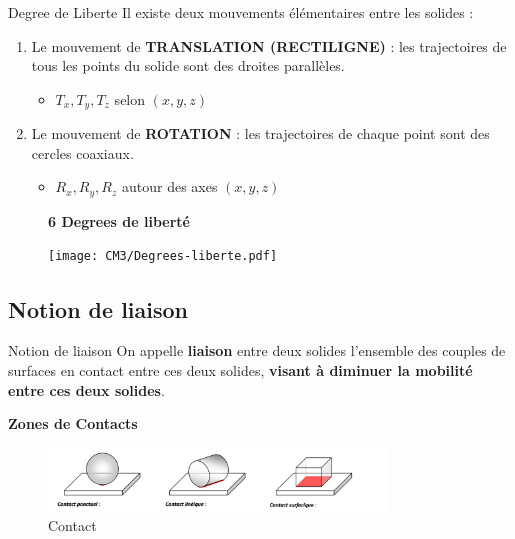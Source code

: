 \documentclass[
  ignorenonframetext,
  aspectratio=169,
  c]{beamer}
\providecommand{\tightlist}{%
  \setlength{\itemsep}{0pt}\setlength{\parskip}{0pt}}\usepackage{longtable,booktabs,array}
\begin{document}
\begin{frame}{Degree de Liberte}
\label{degree-de-liberte}
Il existe deux mouvements élémentaires entre les solides :

\begin{enumerate}
\tightlist
\item
  Le mouvement de \textbf{TRANSLATION (RECTILIGNE)} : les trajectoires
  de tous les points du solide sont des droites parallèles.

  \begin{itemize}
  \tightlist
  \item
    \(T_x, T_y, T_z\) selon \((x,y,z)\)
  \end{itemize}
\item
  Le mouvement de \textbf{ROTATION} : les trajectoires de chaque point
  sont des cercles coaxiaux.

  \begin{itemize}
  \tightlist
  \item
    \(R_x, R_y, R_z\) autour des axes \((x,y,z)\)
  \end{itemize}
\end{enumerate}

\begin{figure}

\begin{minipage}{0.70\linewidth}
\textbf{6 Degrees de liberté}\end{minipage}%
%
\begin{minipage}{0.30\linewidth}
\begin{center}
\texttt{[image: CM3/Degrees-liberte.pdf]}
\end{center}
\end{minipage}%

\end{figure}%
\end{frame}

\subsection{Notion de liaison}\label{notion-de-liaison}

\begin{frame}{Notion de liaison}
On appelle \textbf{liaison} entre deux solides l'ensemble des couples de
surfaces en contact entre ces deux solides, \textbf{visant à diminuer la
mobilité entre ces deux solides}.

\textbf{Zones de Contacts}

\begin{figure}[H]

{\centering \includegraphics[width=0.8\textwidth,height=\textheight]{CM3/Contact.png}

}

\caption{Contact}

\end{figure}%
\end{frame}
\end{document}

